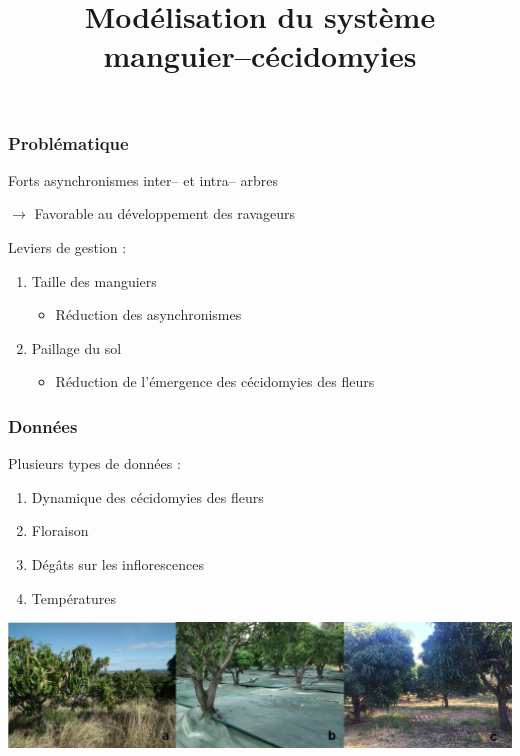 \documentclass[11pt, a4paper]{beamer}
\title{Modélisation du système manguier--cécidomyies}
\author{}
\date{}
\newcommand{\1}{\mbox{\textbf{1}}}
\begin{document}
 
 \begin{frame}
  \titlepage
 \end{frame}
 

\begin{frame}
\frametitle{Problématique}
Forts asynchronismes inter-- et intra-- arbres

\hspace*{1cm}$\longrightarrow$ Favorable au développement des ravageurs

\vspace*{1.5cm}

Leviers de gestion :
\begin{enumerate}
 \item Taille des manguiers
 \begin{itemize}
  \item Réduction des asynchronismes
 \end{itemize}
 \item Paillage du sol
 \begin{itemize}
  \item Réduction de l'émergence des cécidomyies des fleurs
 \end{itemize}
\end{enumerate}


\end{frame}




\begin{frame}
 \frametitle{Données}
 Plusieurs types de données : 
 \begin{enumerate}
  \item Dynamique des cécidomyies des fleurs
  \item Floraison
  \item Dégâts sur les inflorescences
  \item Températures
 \end{enumerate}
 \includegraphics[scale=0.38]{sol.png}
\end{frame}

\end{document}
